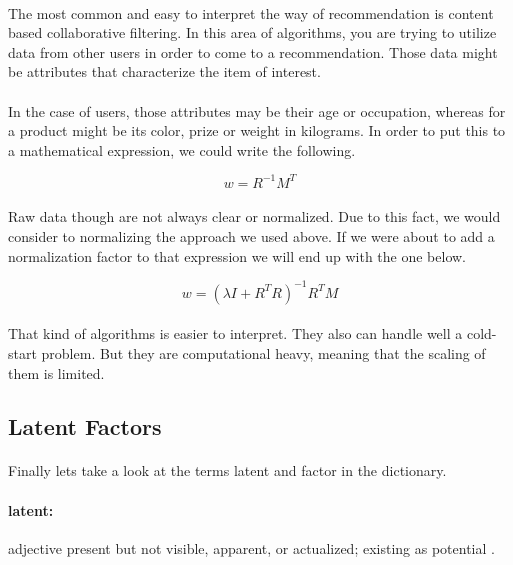 \paragraph{}The most common and easy to interpret the way of recommendation is content based collaborative filtering. In this area of algorithms, you are trying to utilize data from other users in order to come to a recommendation. Those data might be attributes that characterize the item of interest. 
\paragraph{}In the case of users, those attributes may be their age or occupation, whereas for a product might be its color, prize or weight in kilograms. In order to put this to a mathematical expression, we could write the following.

\begin{equation}
w=R^{-1}M^{T}
\end{equation}

\paragraph{}Raw data though are not always clear or normalized. Due to this fact, we would consider to normalizing the approach we used above. If we were about to add a normalization factor to that expression we will end up with the one below.

\begin{equation}
w=(\lambda I + R^{T}R)^{-1} R^{T}M 
\end{equation}

\paragraph{}That kind of algorithms is easier to interpret. They also can handle well a cold-start problem. But they are computational heavy, meaning that the scaling of them is limited.

\subsection{Latent Factors}
\paragraph{} Finally lets take a look at the terms latent and factor in the dictionary.
\paragraph{latent:} adjective present but not visible, apparent, or actualized; existing as potential \cite{Dictionary.com2017}.
